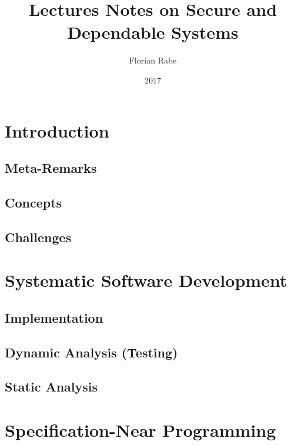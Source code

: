 \documentclass{book}
\title{Lectures Notes on Secure and Dependable Systems}
\author{Florian Rabe}
\date{2017}
\begin{document}
\maketitle

\tableofcontents
\newpage

\part{Introduction}

 \chapter{Meta-Remarks}
  

  \chapter{Concepts}
   

 \chapter{Challenges}
   

\part{Systematic Software Development}

  \chapter{Implementation}
    

  \chapter{Dynamic Analysis (Testing)}
    

  \chapter{Static Analysis}
    
    

\part{Specification-Near Programming}
\end{document}
